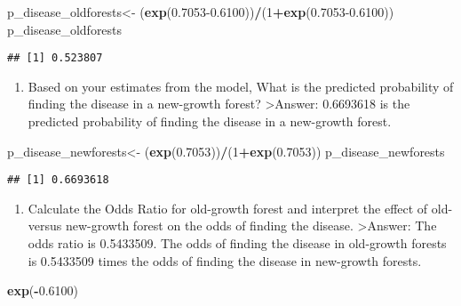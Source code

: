 \documentclass[
]{article}
\newenvironment{Shaded}{\begin{snugshade}}{\end{snugshade}}
\newcommand{\DecValTok}[1]{\textcolor[rgb]{0.00,0.00,0.81}{#1}}
\newcommand{\FloatTok}[1]{\textcolor[rgb]{0.00,0.00,0.81}{#1}}
\newcommand{\FunctionTok}[1]{\textcolor[rgb]{0.13,0.29,0.53}{\textbf{#1}}}
\newcommand{\NormalTok}[1]{#1}
\newcommand{\OtherTok}[1]{\textcolor[rgb]{0.56,0.35,0.01}{#1}}
\newcommand{\SpecialCharTok}[1]{\textcolor[rgb]{0.81,0.36,0.00}{\textbf{#1}}}
\providecommand{\tightlist}{%
  \setlength{\itemsep}{0pt}\setlength{\parskip}{0pt}}
\begin{document}
\begin{Shaded}
\begin{Highlighting}[]
\NormalTok{p\_disease\_oldforests}\OtherTok{\textless{}{-}}\NormalTok{ (}\FunctionTok{exp}\NormalTok{(}\FloatTok{0.7053{-}0.6100}\NormalTok{))}\SpecialCharTok{/}\NormalTok{(}\DecValTok{1}\SpecialCharTok{+}\FunctionTok{exp}\NormalTok{(}\FloatTok{0.7053{-}0.6100}\NormalTok{))}
\NormalTok{p\_disease\_oldforests}
\end{Highlighting}
\end{Shaded}

\begin{verbatim}
## [1] 0.523807
\end{verbatim}

\begin{enumerate}
\def\labelenumi{\alph{enumi}.}
\setcounter{enumi}{2}
\tightlist
\item
  Based on your estimates from the model, What is the predicted
  probability of finding the disease in a new-growth forest?
  \textgreater Answer: 0.6693618 is the predicted probability of finding
  the disease in a new-growth forest.
\end{enumerate}

\begin{Shaded}
\begin{Highlighting}[]
\NormalTok{p\_disease\_newforests}\OtherTok{\textless{}{-}}\NormalTok{ (}\FunctionTok{exp}\NormalTok{(}\FloatTok{0.7053}\NormalTok{))}\SpecialCharTok{/}\NormalTok{(}\DecValTok{1}\SpecialCharTok{+}\FunctionTok{exp}\NormalTok{(}\FloatTok{0.7053}\NormalTok{))}
\NormalTok{p\_disease\_newforests}
\end{Highlighting}
\end{Shaded}

\begin{verbatim}
## [1] 0.6693618
\end{verbatim}

\begin{enumerate}
\def\labelenumi{\alph{enumi}.}
\setcounter{enumi}{3}
\tightlist
\item
  Calculate the Odds Ratio for old-growth forest and interpret the
  effect of old- versus new-growth forest on the odds of finding the
  disease. \textgreater Answer: The odds ratio is 0.5433509. The odds of
  finding the disease in old-growth forests is 0.5433509 times the odds
  of finding the disease in new-growth forests.
\end{enumerate}

\begin{Shaded}
\begin{Highlighting}[]
\FunctionTok{exp}\NormalTok{(}\SpecialCharTok{{-}}\FloatTok{0.6100}\NormalTok{)}
\end{Highlighting}
\end{Shaded}
\end{document}
